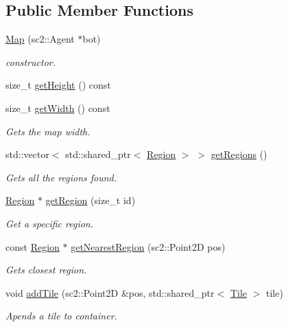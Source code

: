 \subsection*{Public Member Functions}
\begin{DoxyCompactItemize}
\item 
\hyperlink{classOverseer_1_1Map_a4f7eabe216b39eb4a63a8d0b4f8abf60}{Map} (sc2\+::\+Agent $\ast$bot)
\begin{DoxyCompactList}\small\item\em constructor. \end{DoxyCompactList}\item 
size\+\_\+t \hyperlink{classOverseer_1_1Map_a9993be7938014be6b9d66ffb0475a311}{get\+Height} () const 
\item 
size\+\_\+t \hyperlink{classOverseer_1_1Map_a803fae03c7ba59500f55c05dbc269c34}{get\+Width} () const 
\begin{DoxyCompactList}\small\item\em Gets the map width. \end{DoxyCompactList}\item 
std\+::vector$<$ std\+::shared\+\_\+ptr$<$ \hyperlink{classOverseer_1_1Region}{Region} $>$ $>$ \hyperlink{classOverseer_1_1Map_aebe6ebfce6f851c0f2e9cb86aaad9ade}{get\+Regions} ()
\begin{DoxyCompactList}\small\item\em Gets all the regions found. \end{DoxyCompactList}\item 
\hyperlink{classOverseer_1_1Region}{Region} $\ast$ \hyperlink{classOverseer_1_1Map_a98a38caabf4efc5fb586c84106ee09de}{get\+Region} (size\+\_\+t id)
\begin{DoxyCompactList}\small\item\em Get a specific region. \end{DoxyCompactList}\item 
const \hyperlink{classOverseer_1_1Region}{Region} $\ast$ \hyperlink{classOverseer_1_1Map_ade63742e200817b1b2ab12a1637decbb}{get\+Nearest\+Region} (sc2\+::\+Point2D pos)
\begin{DoxyCompactList}\small\item\em Gets closest region. \end{DoxyCompactList}\item 
void \hyperlink{classOverseer_1_1Map_afb26aba6abeaa039ae83b40c8235dee9}{add\+Tile} (sc2\+::\+Point2D \&pos, std\+::shared\+\_\+ptr$<$ \hyperlink{classOverseer_1_1Tile}{Tile} $>$ tile)
\begin{DoxyCompactList}\small\item\em Apends a tile to container. \end{DoxyCompactList}\item 

\end{DoxyCompactItemize}
